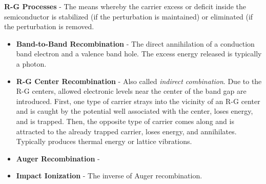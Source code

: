 \vspace{0.5cm}
\noindent
    \textbf{R-G Processes} - The means whereby the carrier excess or deficit inside the semiconductor is stabilized (if the perturbation is maintained) or eliminated (if the perturbation is removed.
    \vspace{0.15cm}
    \begin{itemize}
        \setlength\itemsep{0.5em}
        \item{\textbf{Band-to-Band Recombination} - The direct annihilation of a conduction band electron and a valence band hole.  The excess energy released is typically a photon.}
        \item{\textbf{R-G Center Recombination} - Also called \emph{indirect combination}.  Due to the R-G centers, allowed electronic levels near the center of the band gap are introduced.  First, one type of carrier strays into the vicinity of an R-G center and is caught by the potential well associated with the center, loses energy, and is trapped.  Then, the opposite type of carrier comes along and is attracted to the already trapped carrier, loses energy, and annihilates.  Typically produces thermal energy or lattice vibrations.}
        \item{\textbf{Auger Recombination} - }
        \item{\textbf{Impact Ionization} - The inverse of Auger recombination.}
    \end{itemize}
